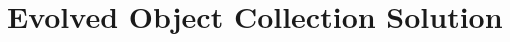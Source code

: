 \chapter{Evolved Object Collection Solution}
\label{app:CollectionSolution}
\singlespacing

\begin{multicols}{2}
  \tiny
  
\end{multicols}

\doublespacing
